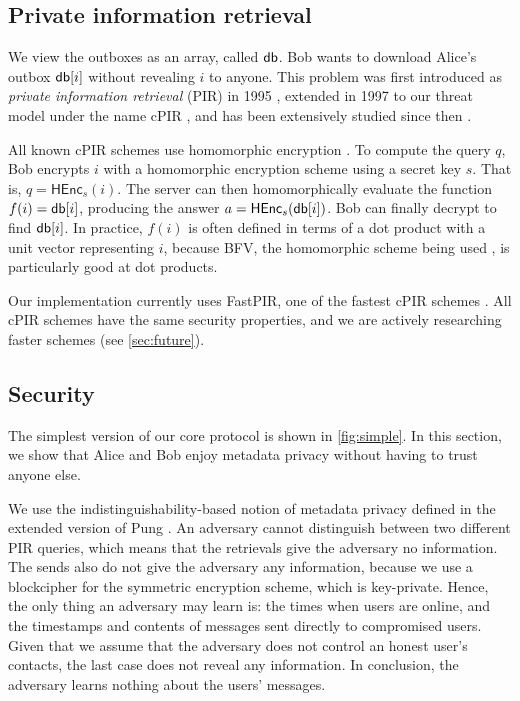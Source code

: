 \subsection{Private information retrieval}

We view the outboxes as an array, called $\mathsf{db}$. Bob wants to download Alice's outbox $\mathsf{db}[i]$ without revealing $i$ to anyone. This problem was first introduced as \textit{private information retrieval} (PIR) in 1995 \cite{chor1995private}, extended in 1997 to our threat model under the name cPIR \cite{kushilevitz1997replication}, and has been extensively studied since then \cite{melchor2016xpir,angel2018pir, ahmad2021addra}.

All known cPIR schemes use homomorphic encryption \cite{gentry2010computing}. To compute the query $q$, Bob encrypts $i$ with a homomorphic encryption scheme using a secret key $s$. That is, $q = \mathsf{HEnc}_s(i)$. The server can then homomorphically evaluate the function $f(i) = \mathsf{db}[i]$, producing the answer $a = \mathsf{HEnc}_s(\mathsf{db}[i])$. Bob can finally decrypt to find $\mathsf{db}[i]$. In practice, $f(i)$ is often defined in terms of a dot product with a unit vector representing $i$, because BFV, the homomorphic scheme being used \cite{fan2012somewhat}, is particularly good at dot products.

Our implementation currently uses FastPIR, one of the fastest cPIR schemes \cite{ahmad2021addra}. All cPIR schemes have the same security properties, and we are actively researching faster schemes (see \cref{sec:future}).

\subsection{Security}
\label{subsec:core-security}

The simplest version of our core protocol is shown in \cref{fig:simple}. In this section, we show that Alice and Bob enjoy metadata privacy without having to trust anyone else.

We use the indistinguishability-based notion of metadata privacy defined in the extended version of Pung \cite{angel2016unobservable}. An adversary cannot distinguish between two different PIR queries, which means that the retrievals give the adversary no information. The sends also do not give the adversary any information, because we use a blockcipher for the symmetric encryption scheme, which is key-private. Hence, the only thing an adversary may learn is: the times when users are online, and the timestamps and contents of messages sent directly to compromised users. Given that we assume that the adversary does not control an honest user's contacts, the last case does not reveal any information. In conclusion, the adversary learns nothing about the users' messages.

